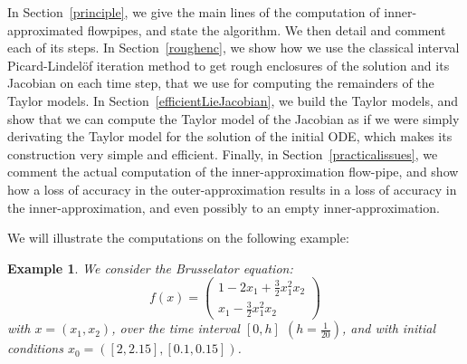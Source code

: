 \documentclass{sig-alternate-05-2015} %
\newtheorem{example}{Example}
\begin{document}
In Section~\ref{principle}, we give the main lines of the computation of inner-approximated flowpipes, 
and state the algorithm. We then detail and comment each of its steps. In Section~\ref{roughenc}, we
show how we use the classical interval Picard-Lindel\"of iteration method to get rough
enclosures of the solution and its Jacobian  on each time step, that we use for computing the remainders of the Taylor models.
In Section~\ref{efficientLieJacobian}, we build the Taylor models, and show that  we can compute
the Taylor model of the Jacobian as if we were simply derivating the Taylor model for the solution of the initial ODE, 
which makes its construction very simple and efficient. Finally, in Section~\ref{practicalissues}, we comment the actual 
computation of the inner-approximation flow-pipe, and show how a loss of accuracy in the outer-approximation results in 
a loss of accuracy in the inner-approximation, and even possibly to an empty inner-approximation.

We will illustrate the computations on the following example:
\begin{example}
\label{running0}
We consider the Brusselator equation: 
$$ f(x) = \left(\begin{array}{l}
1-2 x_1+\frac{3}{2} x_1^2 x_2 \\
x_1-\frac{3}{2} x_1^2x_2
\end{array}\right)$$
\noindent with $x=(x_1,x_2)$, over the time interval $\left[0,h\right]$ 
$\left(h=\frac{1}{20}\right)$, and with initial conditions
$x_0=\left([2, 2.15],[0.1, 0.15]\right)$.
\end{example}


\end{document}
